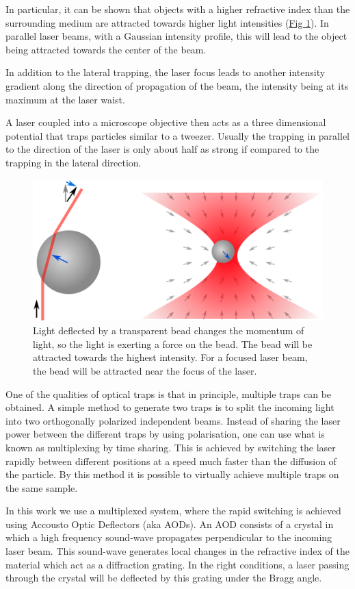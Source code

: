 \documentclass[A4paperpaper,11pt,english]{sphinxmanual}
\begin{document}
In particular, it can be shown that objects with a higher refractive
index than the surrounding medium are attracted towards higher light intensities
(\hyperref[index-latex:setup]{Fig  \ref*{index-latex:setup}}).  In parallel laser beams, with a Gaussian intensity
profile, this will lead to the object being attracted towards the center of the
beam.

In addition to the lateral trapping, the laser focus leads to
another intensity gradient along the direction of propagation of the
beam, the intensity being at its maximum at the laser waist.

A laser coupled into a microscope objective then acts as a three dimensional
potential that traps particles similar to a tweezer. Usually the trapping in
parallel to the direction of the laser is only about half as strong if compared to the trapping in the
lateral direction.
\begin{figure}[htbp]
\centering
\capstart

\includegraphics[width=0.700\linewidth]{ot1.png}
\caption{Light deflected by a transparent bead changes the momentum of light, so the
light is exerting a force on the bead. The bead will be attracted towards
the highest intensity.  For a focused laser beam, the bead will be attracted
near the focus of the laser.}\label{index-latex:setup}\end{figure}

One of the qualities of optical traps is that in principle, multiple traps can be
obtained. A simple method to generate two traps is to split the incoming light
into two orthogonally polarized independent beams.  Instead of sharing the
laser power between the different traps by using polarisation, one can use what
is known as multiplexing by time sharing. This is achieved by switching the laser rapidly
between different positions at a speed much faster than the diffusion of the particle. By this method
it is possible to virtually achieve multiple traps on the same
sample.

In this work we use a multiplexed system, where the rapid switching is achieved using Accousto Optic Deflectors
(aka AODs).  An AOD consists of a crystal in which a high frequency
sound-wave propagates perpendicular to the incoming laser beam. This sound-wave generates local changes in the
refractive index of the material which act as a diffraction grating. In
the right conditions, a laser passing through the crystal will
be deflected by this grating under the Bragg angle.
\end{document}
